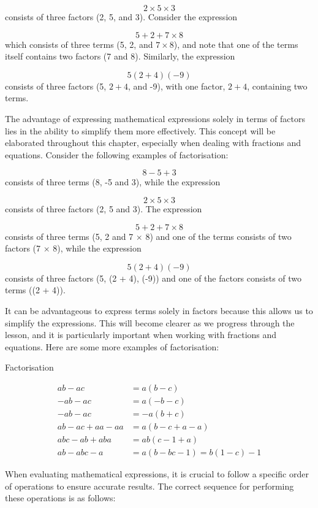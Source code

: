 \[ 
2 \times 5 \times 3 
\]
consists of three factors (2, 5, and 3). Consider the expression 

\[ 
5 + 2 + 7 \times 8 
\]
which consists of three terms (5, 2, and \(7 \times 8\)), and note that one of the terms itself contains two factors (7 and 8). Similarly, the expression 

\[ 
5(2 + 4)(-9) 
\]
consists of three factors (5, \(2 + 4\), and -9), with one factor, \(2 + 4\), containing two terms.

The advantage of expressing mathematical expressions solely in terms of factors lies in the ability to simplify them more effectively. This concept will be elaborated throughout this chapter, especially when dealing with fractions and equations. Consider the following examples of factorisation:

\[ 
8 - 5 + 3 
\]
consists of three terms (8, -5 and 3), while the expression 

\[ 
2 \times 5 \times 3 
\]
consists of three factors (2, 5 and 3). The expression 

\[ 
5 + 2 + 7 \times 8 
\]
consists of three terms (5, 2 and 7 \(\times\) 8) and one of the terms consists of two factors (7 \(\times\) 8), while the expression 

\[ 
5(2 + 4)(-9) 
\]
consists of three factors (5, (2 + 4), (-9)) and one of the factors consists of two terms ((2 + 4)).

It can be advantageous to express terms solely in factors because this allows us to simplify the expressions. This will become clearer as we progress through the lesson, and it is particularly important when working with fractions and equations. Here are some more examples of factorisation:

\begin{example} Factorisation

\begin{align*}
ab - ac &= a(b - c) \\
-ab - ac &= a(-b - c) \\
-ab - ac &= -a(b + c) \\
ab - ac + aa - aa &= a(b - c + a - a) \\
abc - ab + aba &= ab(c - 1 + a) \\
ab - abc - a &= a(b - bc - 1) = b(1 - c) - 1
\end{align*}

\end{example}

When evaluating mathematical expressions, it is crucial to follow a specific order of operations to ensure accurate results. The correct sequence for performing these operations is as follows:

